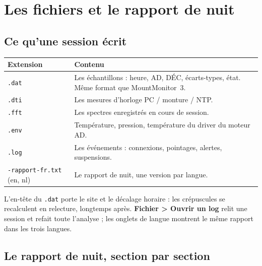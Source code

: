 \chapter{Les fichiers et le rapport de nuit}
\label{ch:files}

\section{Ce qu'une session écrit}

\begin{center}
\begin{tabularx}{\textwidth}{lX}
\toprule
\textbf{Extension} & \textbf{Contenu} \\
\midrule
\texttt{.dat} & Les échantillons : heure, AD, DÉC, écarts-types, état. Même
format que MountMonitor~3. \\
\texttt{.dti} & Les mesures d'horloge PC / monture / NTP. \\
\texttt{.fft} & Les spectres enregistrés en cours de session. \\
\texttt{.env} & Température, pression, température du driver du moteur AD. \\
\texttt{.log} & Les événements : connexions, pointages, alertes,
suspensions. \\
\texttt{-rapport-fr.txt} (en, nl) & Le rapport de nuit, une version par
langue. \\
\bottomrule
\end{tabularx}
\end{center}

L'en-tête du \texttt{.dat} porte le site et le décalage horaire : les
crépuscules se recalculent en relecture, longtemps après. \textbf{Fichier >
Ouvrir un log} relit une session et refait toute l'analyse ; les onglets de
langue montrent le même rapport dans les trois langues.

\needspace{0.6\textheight}
\section{Le rapport de nuit, section par section}
\label{sec:report}


